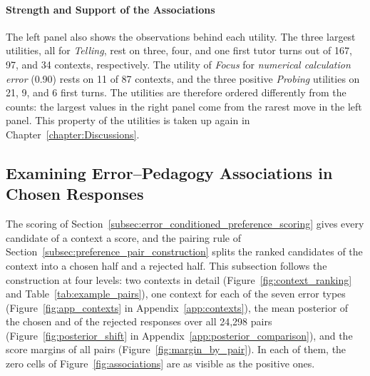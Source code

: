     \paragraph{Strength and Support of the Associations}
    The left panel also shows the observations behind each utility. The three largest utilities, all for \textit{Telling}, rest on three, four, and one first tutor turns out of 167, 97, and 34 contexts, respectively. The utility of \textit{Focus} for \textit{numerical calculation error} (0.90) rests on 11 of 87 contexts, and the three positive \textit{Probing} utilities on 21, 9, and 6 first turns. The utilities are therefore ordered differently from the counts: the largest values in the right panel come from the rarest move in the left panel. This property of the utilities is taken up again in Chapter~\ref{chapter:Discussions}.

\subsection{Examining Error--Pedagogy Associations in Chosen Responses}\label{subsec:associations_in_pairs}
The scoring of Section~\ref{subsec:error_conditioned_preference_scoring} gives every candidate of a context a score, and the pairing rule of Section~\ref{subsec:preference_pair_construction} splits the ranked candidates of the context into a chosen half and a rejected half. This subsection follows the construction at four levels: two contexts in detail (Figure~\ref{fig:context_ranking} and Table~\ref{tab:example_pairs}), one context for each of the seven error types (Figure~\ref{fig:app_contexts} in Appendix~\ref{app:contexts}), the mean posterior of the chosen and of the rejected responses over all 24,298 pairs (Figure~\ref{fig:posterior_shift} in Appendix~\ref{app:posterior_comparison}), and the score margins of all pairs (Figure~\ref{fig:margin_by_pair}). In each of them, the zero cells of Figure~\ref{fig:associations} are as visible as the positive ones.

